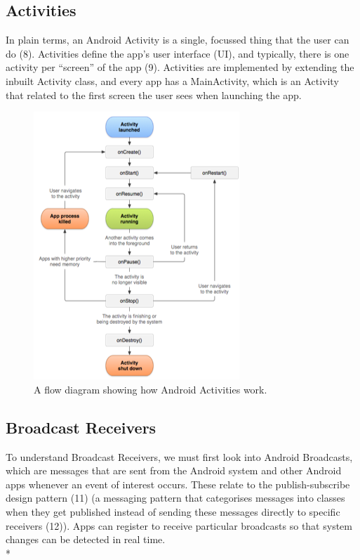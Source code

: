\documentclass[12pt,twoside]{report}
\begin{document}
\subsection{Activities}

In plain terms, an Android Activity is a single, focussed thing that the user can do (8). Activities define the app’s user interface (UI), and typically, there is one activity per “screen” of the app (9). Activities are implemented by extending the inbuilt Activity class, and every app has a MainActivity, which is an Activity that related to the first screen the user sees when launching the app. 

\begin{figure}[h!]
    \centering
    \includegraphics{./figures/Activity_Diagram.png}
    \caption{A flow diagram showing how Android Activities work.}
    \label{fig:my_label}
\end{figure} 

\subsection{Broadcast Receivers}

To understand Broadcast Receivers, we must first look into Android Broadcasts, which are messages that are sent from the Android system and other Android apps whenever an event of interest occurs. These relate to the publish-subscribe design pattern (11) (a messaging pattern that categorises messages into classes when they get published instead of sending these messages directly to specific receivers (12)). Apps can register to receive particular broadcasts so that system changes can be detected in real time. \\*
\end{document}
